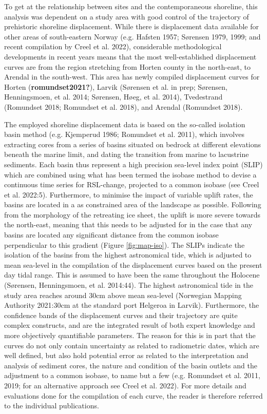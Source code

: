 \documentclass[
]{article}
\begin{document}
To get at the relationship between sites and the contemporaneous shoreline, this analysis was dependent on a study area with good control of the trajectory of prehistoric shoreline displacement. While there is displacement data available for other areas of south-eastern Norway (e.g. Hafsten 1957; Sørensen 1979, 1999; and recent compilation by Creel et al. 2022), considerable methodological developments in recent years means that the most well-established displacement curves are from the region stretching from Horten county in the north-east, to Arendal in the south-west. This area has newly compiled displacement curves for Horten (\textbf{romundset2021?}), Larvik (Sørensen et al. in prep; Sørensen, Henningsmoen, et al. 2014; Sørensen, Høeg, et al. 2014), Tvedestrand (Romundset 2018; Romundset et al. 2018), and Arendal (Romundset 2018).

The employed shoreline displacement data is based on the so-called isolation basin method (e.g. Kjemperud 1986; Romundset et al. 2011), which involves extracting cores from a series of basins situated on bedrock at different elevations beneath the marine limit, and dating the transition from marine to lacustrine sediments. Each basin thus represent a high precision sea-level index point (SLIP) which are combined using what has been termed the isobase method to devise a continuous time series for RSL-change, projected to a common isobase (see Creel et al. 2022:5). Furthermore, to minimise the impact of variable uplift rates, the basins are located in a as constrained area of the landscape as possible. Following from the morphology of the retreating ice sheet, the uplift is more severe towards the north-east, meaning that this needs to be adjusted for in the case that any basins are located any significant distance from the common isobase perpendicular to this gradient (Figure \ref{fig:map-iso}). The SLIPs indicate the isolation of the basins from the highest astronomical tide, which is adjusted to mean sea-level in the compilation of the displacement curves based on the present day tidal range. This is assumed to have been the same throughout the Holocene (Sørensen, Henningsmoen, et al. 2014:44). The highest astronomical tide in the study area reaches around 30cm above mean sea-level (Norwegian Mapping Authority 2021:30cm at the standard port Helgeroa in Larvik). Furthermore, the confidence bands of the displacement curves and their trajectory are quite complex constructs, and are the integrated result of both expert knowledge and more objectively quantifiable parameters. The reason for this is in part that the curves do not only contain uncertainty as related to radiometric dates, which are well defined, but also hold potential error as related to the interpretation and analysis of sediment cores, the nature and condition of the basin outlets and the adjustment to a common isobase, to name but a few (e.g. Romundset et al. 2011, 2019; for an alternative approach see Creel et al. 2022). For more details and evaluations done for the compilation of each curve, the reader is therefore referred to the individual publications.
\end{document}

